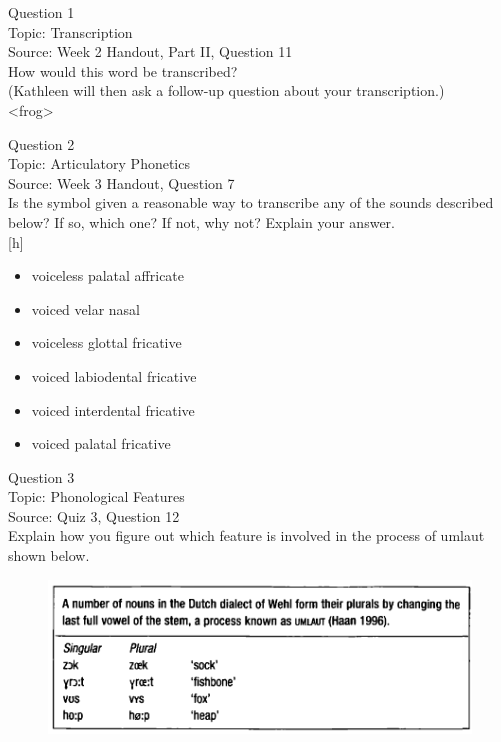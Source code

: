 \documentclass[12pt]{article}
\begin{document}
{\large Question 1}\\

Topic: Transcription\\
Source: Week 2 Handout, Part II, Question 11\\

How would this word be transcribed?\\ (Kathleen will then ask a follow-up question about your transcription.)\\

<frog>


\newpage

{\large Question 2}\\

Topic: Articulatory Phonetics\\
Source: Week 3 Handout, Question 7\\

Is the symbol given a reasonable way to transcribe any of the sounds described below? If so, which one? If not, why not? Explain your answer.\\

{[h]}

\begin{itemize} \item voiceless palatal affricate \item voiced velar nasal \item voiceless glottal fricative \item voiced labiodental fricative \item voiced interdental fricative \item voiced palatal fricative \end{itemize}


\newpage

{\large Question 3}\\

Topic: Phonological Features\\
Source: Quiz 3, Question 12\\

Explain how you figure out which feature is involved in the process of umlaut shown below.\\

\begin{figure}[H]
\includegraphics{../images/dutch.png}
\end{figure}
\end{document}
